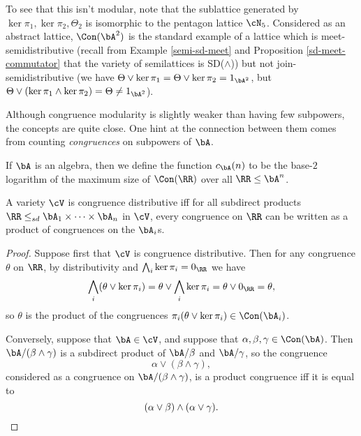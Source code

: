 \begin{ex}
\begin{center}
\end{center}
To see that this isn't modular, note that the sublattice generated by $\ker \pi_1, \ker \pi_2, \Theta_2$ is isomorphic to the pentagon lattice $\cN_5$. Considered as an abstract lattice, $\Con(\bA^2)$ is the standard example of a lattice which is meet-semidistributive (recall from Example \ref{semi-sd-meet} and Proposition \ref{sd-meet-commutator} that the variety of semilattices is SD($\wedge$)) but not join-semidistributive (we have $\Theta \vee \ker \pi_1 = \Theta \vee \ker \pi_2 = 1_{\bA^2}$, but $\Theta \vee (\ker \pi_1 \wedge \ker \pi_2) = \Theta \ne 1_{\bA^2}$).
\end{ex}

Although congruence modularity is slightly weaker than having few subpowers, the concepts are quite close. One hint at the connection between them comes from counting \emph{congruences} on subpowers of $\bA$.

\begin{defn} If $\bA$ is an algebra, then we define the function $c_\bA(n)$ to be the base-$2$ logarithm of the maximum size of $\Con(\RR)$ over all $\RR \le \bA^n$.
\end{defn}

\begin{prop} A variety $\cV$ is congruence distributive iff for all subdirect products $\RR \le_{sd} \bA_1 \times \cdots \times \bA_n$ in $\cV$, every congruence on $\RR$ can be written as a product of congruences on the $\bA_i$s.
\end{prop}
\begin{proof} Suppose first that $\cV$ is congruence distributive. Then for any congruence $\theta$ on $\RR$, by distributivity and $\bigwedge_i \ker \pi_i = 0_\RR$ we have
\[
\bigwedge_i (\theta \vee \ker \pi_i) = \theta \vee \bigwedge_i \ker \pi_i = \theta \vee 0_\RR = \theta,
\]
so $\theta$ is the product of the congruences $\pi_i(\theta \vee \ker \pi_i) \in \Con(\bA_i)$.

Conversely, suppose that $\bA \in \cV$, and suppose that $\alpha, \beta, \gamma \in \Con(\bA)$. Then $\bA/(\beta \wedge \gamma)$ is a subdirect product of $\bA/\beta$ and $\bA/\gamma$, so the congruence
\[
\alpha \vee (\beta \wedge \gamma),
\]
considered as a congruence on $\bA/(\beta \wedge \gamma)$, is a product congruence iff it is equal to
\[
(\alpha \vee \beta) \wedge (\alpha \vee \gamma).\qedhere
\]
\end{proof}

